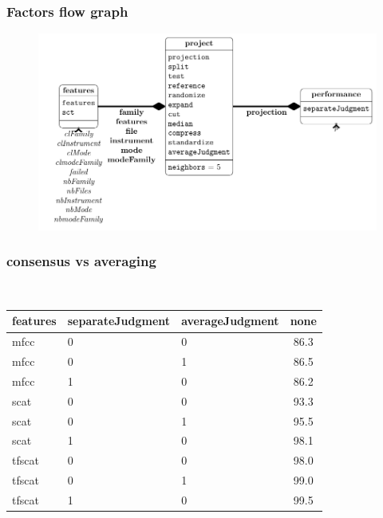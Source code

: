   
 
  
  
\begin{frame}\frametitle{Factors flow graph} 
  
  
\begin{center} 
  
  
\begin{figure} 
  
  
\includegraphics[width=\textwidth,height=0.8\textheight,keepaspectratio]{../figures/factors.pdf} 
  
  
\label{factorFlowGraph} 
  
  
\end{figure} 
  
  
\end{center} 
  
  
\end{frame} 
  
\begin{frame}\frametitle{consensus vs averaging} 
  
\begin{table} 
\begin{center} 
\ 
 \setlength{\tabcolsep}{.16667em} 
\begin{tabular}{lllc} 
features & separateJudgment & averageJudgment & none \\ 
\hline 
mfcc & 0 & 0 & 86.3 \\ 
mfcc & 0 & 1 & 86.5 \\ 
mfcc & 1 & 0 & 86.2 \\ 
scat & 0 & 0 & 93.3 \\ 
scat & 0 & 1 & 95.5 \\ 
scat & 1 & 0 & 98.1 \\ 
tfscat & 0 & 0 & 98.0 \\ 
tfscat & 0 & 1 & 99.0 \\ 
tfscat & 1 & 0 & 99.5 \\ 
\end{tabular} 
\end{center} 
\label{sc1000PrlmTe1RejuRa0Ex0Cu1Me1Co1St1} 
\end{table} 
 
\end{frame}  
  
